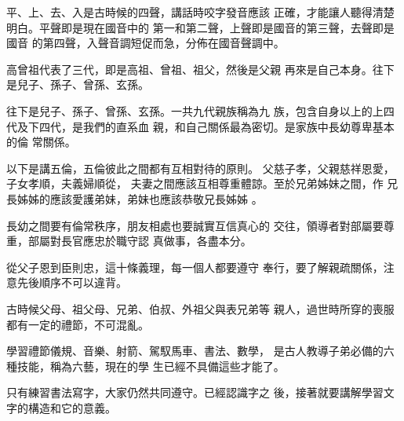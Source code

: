 \documentclass[avery5371,grid]{flashcards}
\begin{document}
{平、上、去、入是古時候的四聲，講話時咬字發音應該
正確，才能讓人聽得清楚明白。平聲即是現在國音中的
第一和第二聲，上聲即是國音的第三聲，去聲即是國音
的第四聲，入聲音調短促而急，分佈在國音聲調中。} %
{} %





{高曾祖代表了三代，即是高祖、曾祖、祖父，然後是父親
再來是自己本身。往下是兒子、孫子、曾孫、玄孫。} %
{} %

{往下是兒子、孫子、曾孫、玄孫。一共九代親族稱為九
族，包含自身以上的上四代及下四代，是我們的直系血
親，和自己關係最為密切。是家族中長幼尊卑基本的倫
常關係。} %
{} %


{以下是講五倫，五倫彼此之間都有互相對待的原則。
父慈子孝，父親慈祥恩愛，子女孝順，夫義婦順從，
夫妻之間應該互相尊重體諒。至於兄弟姊妹之間，作
兄長姊姊的應該愛護弟妹，弟妹也應該恭敬兄長姊姊
。} %
{} %


{長幼之間要有倫常秩序，朋友相處也要誠實互信真心的
交往，領導者對部屬要尊重，部屬對長官應忠於職守認
真做事，各盡本分。} %
{} %


{從父子恩到臣則忠，這十條義理，每一個人都要遵守
奉行，要了解親疏關係，注意先後順序不可以違背。} %
{} %


{古時候父母、祖父母、兄弟、伯叔、外祖父與表兄弟等
親人，過世時所穿的喪服都有一定的禮節，不可混亂。} %
{} %

{學習禮節儀規、音樂、射箭、駕馭馬車、書法、數學，
是古人教導子弟必備的六種技能，稱為六藝，現在的學
生已經不具備這些才能了。} %
{} %

{只有練習書法寫字，大家仍然共同遵守。已經認識字之
後，接著就要講解學習文字的構造和它的意義。} %
{} %
\end{document}
